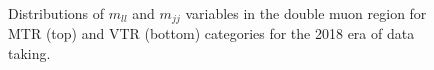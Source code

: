 \begin{figure}[htbp]
{    }
  \caption{Distributions of $m_{ll}$ and $m_{jj}$ variables in the double muon region for MTR (top) and VTR (bottom) categories for the 2018 era of data taking.}
  \label{fig:2018_Zee_1}
\end{figure}


